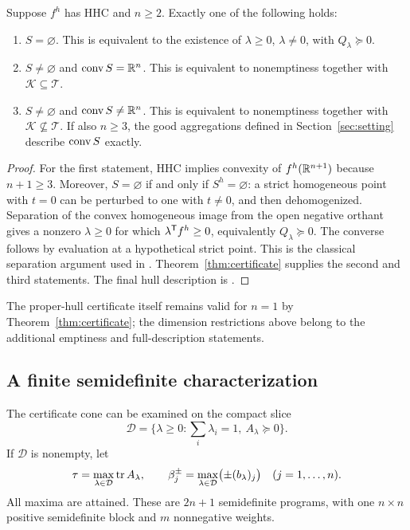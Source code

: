 \begin{corollary}\label{cor:regimes}
Suppose $f^h$ has HHC and $n\geq2$. Exactly one of the following holds:
\begin{enumerate}
\item $S=\varnothing$. This is equivalent to the existence of
      $\lambda\geq0$, $\lambda\ne0$, with $Q_\lambda\succeq0$.
\item $S\ne\varnothing$ and $\operatorname{conv} S=\mathbb R^n$. This is equivalent to
      nonemptiness together with $\mathcal K\subseteq\mathcal T$.
\item $S\ne\varnothing$ and $\operatorname{conv} S\ne\mathbb R^n$. This is equivalent to
      nonemptiness together with $\mathcal K\not\subseteq\mathcal T$.
      If also $n\geq3$, the good aggregations defined in
      Section~\ref{sec:setting} describe $\operatorname{conv} S$ exactly.
\end{enumerate}
\end{corollary}
\begin{proof}
For the first statement, HHC implies convexity of $f^h(\mathbb R^{n+1})$
because $n+1\geq3$. Moreover, $S=\varnothing$ if and only if
$S^h=\varnothing$: a strict homogeneous point with $t=0$ can be
perturbed to one with $t\ne0$, and then dehomogenized.
Separation of the convex homogeneous image from the open negative
orthant gives a nonzero $\lambda\geq0$ for which
$\lambda^{\mathsf T} f^h\geq0$, equivalently $Q_\lambda\succeq0$.
The converse follows by evaluation at a hypothetical strict point.
This is the classical separation argument used in
\citet[Proposition~2.13]{BDSpreprint}.
Theorem~\ref{thm:certificate} supplies the second and third statements.
The final hull description is
\citet[Theorem~2.9]{BDSpreprint}.
\end{proof}

The proper-hull certificate itself remains valid for $n=1$ by
Theorem~\ref{thm:certificate}; the dimension restrictions above belong
to the additional emptiness and full-description statements.

\subsection{A finite semidefinite characterization}

The certificate cone can be examined on the compact slice
\[
 \mathcal D=\{\lambda\geq0:\textstyle\sum_i\lambda_i=1,
                                      \ A_\lambda\succeq0\}.
\]
If $\mathcal D$ is nonempty, let
\begin{equation}\label{eq:sdp-objectives}
 \tau=\max_{\lambda\in\mathcal D}\operatorname{tr} A_\lambda,
 \qquad
 \beta_j^\pm=\max_{\lambda\in\mathcal D}\bigl(\pm(b_\lambda)_j\bigr)
 \quad(j=1,\ldots,n).
\end{equation}
All maxima are attained. These are $2n+1$ semidefinite programs, with
one $n\times n$ positive semidefinite block and $m$ nonnegative weights.

